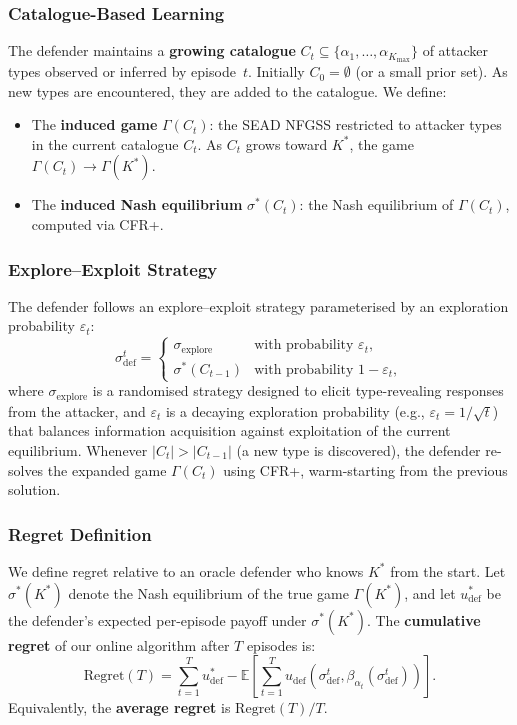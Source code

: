 \documentclass[sigconf]{aamas}
\newcommand{\Kmax}{K_{\max}}
\newcommand{\E}{\mathbb{E}}
\begin{document}
\subsubsection{Catalogue-Based Learning}
The defender maintains a \textbf{growing catalogue} $C_t \subseteq \{\alpha_1, \ldots, \alpha_{\Kmax}\}$ of attacker types observed or inferred by episode~$t$. Initially $C_0 = \emptyset$ (or a small prior set). As new types are encountered, they are added to the catalogue. We define:
\begin{itemize}
    \item The \textbf{induced game} $\Gamma(C_t)$: the SEAD NFGSS restricted to attacker types in the current catalogue $C_t$. As $C_t$ grows toward $K^*$, the game $\Gamma(C_t) \to \Gamma(K^*)$.
    \item The \textbf{induced Nash equilibrium} $\sigma^*(C_t)$: the Nash equilibrium of $\Gamma(C_t)$, computed via CFR+.
\end{itemize}

\subsubsection{Explore--Exploit Strategy}
The defender follows an explore--exploit strategy parameterised by an exploration probability $\varepsilon_t$:
\begin{equation}
    \sigma_{\mathrm{def}}^t = \begin{cases}
        \sigma_{\mathrm{explore}} & \text{with probability } \varepsilon_t, \\
        \sigma^*(C_{t-1}) & \text{with probability } 1 - \varepsilon_t,
    \end{cases}
    \label{eq:explore_exploit}
\end{equation}
where $\sigma_{\mathrm{explore}}$ is a randomised strategy designed to elicit type-revealing responses from the attacker, and $\varepsilon_t$ is a decaying exploration probability (e.g., $\varepsilon_t = 1/\sqrt{t}$) that balances information acquisition against exploitation of the current equilibrium. Whenever $|C_t| > |C_{t-1}|$ (a new type is discovered), the defender re-solves the expanded game $\Gamma(C_t)$ using CFR+, warm-starting from the previous solution.

\subsubsection{Regret Definition}
We define regret relative to an oracle defender who knows $K^*$ from the start. Let $\sigma^*(K^*)$ denote the Nash equilibrium of the true game $\Gamma(K^*)$, and let $u_{\mathrm{def}}^*$ be the defender's expected per-episode payoff under $\sigma^*(K^*)$. The \textbf{cumulative regret} of our online algorithm after $T$ episodes is:
\begin{equation}
    \mathrm{Regret}(T) = \sum_{t=1}^{T} u_{\mathrm{def}}^* - \E\!\left[\sum_{t=1}^{T} u_{\mathrm{def}}(\sigma_{\mathrm{def}}^t, \beta_{\alpha_t}(\sigma_{\mathrm{def}}^t))\right].
    \label{eq:regret_def}
\end{equation}
Equivalently, the \textbf{average regret} is $\mathrm{Regret}(T) / T$.
\end{document}

